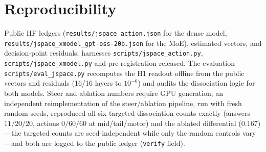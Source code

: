 \documentclass[11pt]{article}
\begin{document}
\section{Reproducibility}
\sloppy
Public HF ledgers (\texttt{results/jspace\_\allowbreak action.json} for the dense model,
\texttt{results/jspace\_\allowbreak xmodel\_\allowbreak gpt-oss-20b.json} for the MoE), estimated
vectors, and decision-point
residuals; harnesses \texttt{scripts/jspace\_action.py}, \texttt{scripts/jspace\_xmodel.py} and
pre-registration released. The evaluation \texttt{scripts/eval\_jspace.py} recomputes the H1 readout
offline from the public vectors and residuals (16/16 layers to $10^{-6}$) and audits the dissociation
logic for both models. Steer and ablation numbers require GPU generation; an independent
reimplementation of the steer/ablation pipeline, run with fresh random seeds, reproduced all six
targeted dissociation counts exactly (answers $11/20/20$, actions $0/60/60$ at mid/tail/motor) and the
ablated differential ($0.167$)---the targeted counts are seed-independent while only the random
controls vary---and both are logged to the public ledger (\texttt{verify} field).
\end{document}
